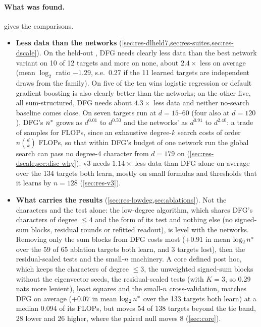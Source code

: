 \paragraph{What was found.}  gives the comparisons.
\begin{itemize}
\item \textbf{Less data than the networks}  (\cref{sec:res-dlheld7,sec:res-suites,sec:res-dscale}). On the held-out , DFG needs clearly less data than the best network variant on 10 of 12 targets and more on none, about $2.4\times$ less on average (mean $\log_2$ ratio $-1.29$, s.e.\ 0.27 if the 11 learned targets are independent draws from the family). On five of the ten wins logistic regression or default gradient boosting is also clearly better than the networks; on the other five, all sum-structured, DFG needs about $4.3\times$ less data and neither no-search baseline comes close. On seven targets run at $d=15$--60 (four also at $d=120$), DFG's $n^{*}$ grows as $d^{0.01}$ to $d^{0.50}$ and the networks' as $d^{0.91}$ to $d^{2.40}$: a trade of samples for FLOPs, since an exhaustive degree-$k$ search costs of order $n\binom dk$ FLOPs, so that within DFG's budget of one network run the global search can pass no degree-4 character from $d=179$ on  (\cref{sec:res-dscale,sec:disc-why}). v3 needs $1.14\times$ less data than DFG alone on average over the 134 targets both learn, mostly on small formulas and thresholds that it learns by $n=128$ (\cref{sec:res-v3}).
\item \textbf{What carries the results}  (\cref{sec:res-lowdeg,sec:ablations}). Not the characters and the test alone: the low-degree algorithm, which shares DFG's characters of degree $\le4$ and the form of its test and nothing else (no signed-sum blocks, residual rounds or refitted readout), is level with the networks. Removing only the sum blocks from DFG costs most ($+0.91$ in mean $\log_2n^{*}$ over the 59 of 65 ablation targets both learn, and 3 targets lost), then the residual-scaled tests and the small-$n$ machinery. A core defined post hoc, which keeps the characters of degree $\le3$, the unweighted signed-sum blocks without the eigenvector seeds, the residual-scaled tests (with $K=3$, so 0.29 nats more lenient), least squares and the small-$n$ cross-validation, matches DFG on average ($+0.07$ in mean $\log_2n^{*}$ over the 133 targets both learn) at a median 0.094 of its FLOPs, but moves 54 of 138 targets beyond the tie band, 28 lower and 26 higher, where the paired null moves 8 (\cref{sec:core}).

\end{itemize}

